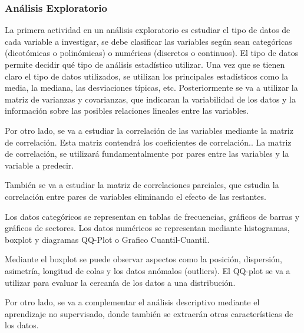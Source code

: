 \subsubsection{Análisis Exploratorio}


La primera actividad en un análisis exploratorio es estudiar el tipo de datos de cada variable a investigar, se debe clasificar las variables según sean categóricas (dicotómicas o polinómicas) o numéricas (discretos o continuos). El tipo de datos permite decidir qué tipo de análisis estadístico utilizar.
Una vez que se tienen claro el tipo de datos utilizados, se utilizan los principales estadísticos como la media, la mediana, las desviaciones típicas, etc.
Posteriormente se va a utilizar la matriz de varianzas y covarianzas, que indicaran la variabilidad de los datos y la información sobre las posibles relaciones lineales entre las variables. 

Por otro lado, se va a estudiar la correlación de las variables mediante la matriz de correlación. Esta matriz contendrá los coeficientes de correlación.\cite{JMMarin}. La matriz de correlación, se utilizará fundamentalmente por pares entre las variables y la variable a predecir.

También se va a estudiar la matriz de correlaciones parciales, que estudia la correlación entre pares de variables eliminando el efecto de las restantes.\cite{JMMarin}

Los datos categóricos se representan en tablas de frecuencias, gráficos de barras y gráficos de sectores. Los datos numéricos se representan mediante histogramas, boxplot y diagramas QQ-Plot o Grafico Cuantil-Cuantil. \cite{Orellana2001}

Mediante el boxplot se puede observar aspectos como la posición, dispersión, asimetría, longitud de colas y los datos anómalos (outliers). 
El QQ-plot se va a utilizar para evaluar la cercanía de los datos a una distribución. \cite{Orellana2001}

Por otro lado, se va a complementar el análisis descriptivo mediante el aprendizaje no supervisado, donde también se extraerán otras características de los datos.

